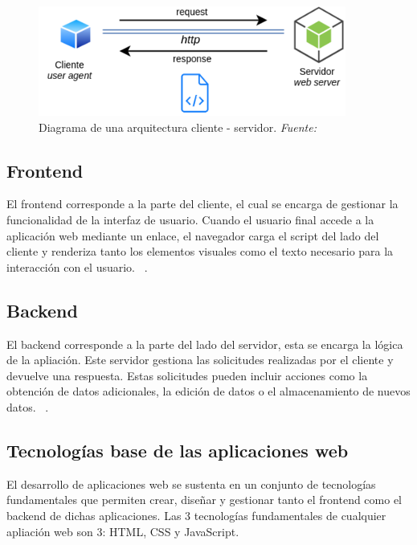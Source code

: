 \begin{figure}[h]
	\centering	 
	\includegraphics[width=0.9\textwidth]{img/chapter03/ui-web-arquitectura.png}
	\caption[Diagrama de una arquitectura cliente - servidor]{Diagrama de una arquitectura cliente - servidor. \textit{Fuente: ~\cite{uqbar-wiki-web}}}
	\label{fig:cliente-servidor}  %
\end{figure}


\subsection{Frontend}
El frontend corresponde a la parte del cliente, el cual se encarga de gestionar la funcionalidad de la interfaz de usuario. Cuando el usuario final accede a la aplicación web mediante un enlace, el navegador carga el script del lado del cliente y renderiza tanto los elementos visuales como el texto necesario para la interacción con el usuario. ~\cite{apliacionWebAmazon}.

\subsection{Backend}
El backend corresponde a la parte del lado del servidor, esta se encarga la lógica de la apliación. Este servidor gestiona las solicitudes realizadas por el cliente y devuelve una respuesta. Estas solicitudes pueden incluir acciones como la obtención de datos adicionales, la edición de datos o el almacenamiento de nuevos datos.  ~\cite{apliacionWebAmazon}.
 

\subsection{Tecnologías base de las aplicaciones web}
El desarrollo de aplicaciones web se sustenta en un conjunto de tecnologías fundamentales que permiten crear, diseñar y gestionar tanto el frontend como el backend de dichas aplicaciones. Las 3 tecnologías fundamentales de cualquier apliación web son 3: HTML, CSS y JavaScript.

